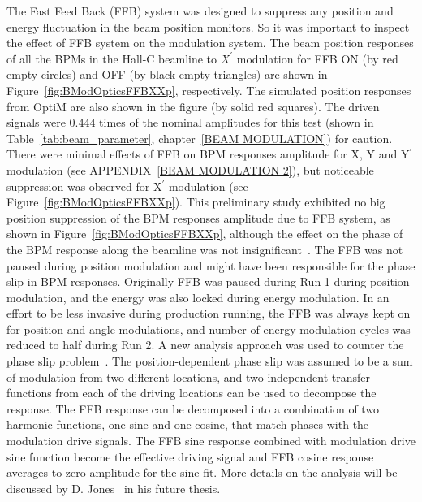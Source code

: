 The Fast Feed Back (FFB) system was designed to suppress any position and energy fluctuation in the beam position monitors. So it was important to inspect the effect of FFB system on the modulation system. The beam position responses of all the BPMs in the Hall-C beamline to $X^{\prime}$ modulation for FFB ON (by red empty circles) and OFF (by black empty triangles) are shown in Figure~\ref{fig:BModOpticsFFBXXp}, respectively. The simulated position responses from OptiM are also shown in the figure (by solid red squares). The driven signals were 0.444 times of the nominal amplitudes for this test (shown in Table~\ref{tab:beam_parameter}, chapter~\ref{BEAM MODULATION}) for caution.
There were minimal effects of FFB on BPM responses amplitude for X, Y and Y$^\prime$ modulation (see APPENDIX~\ref{BEAM MODULATION 2}), but noticeable suppression was observed for X$^\prime$ modulation (see Figure~\ref{fig:BModOpticsFFBXXp}). This preliminary study exhibited no big position suppression of the BPM responses amplitude due to FFB system, as shown in Figure~\ref{fig:BModOpticsFFBXXp}, although the effect on the phase of the BPM response along the beamline was not insignificant~\cite{elog:josh_analysis690}. The FFB was not paused during position modulation and might have been responsible for the phase slip in BPM responses. Originally FFB was paused during Run 1 during position modulation, and the energy was also locked during energy modulation. In an effort to be less invasive during production running, the FFB was always kept on for position and angle modulations, and number of energy modulation cycles was reduced to half during Run 2. A new analysis approach was used to counter the phase slip problem~\cite{elog:kent_analysis695}. The position-dependent phase slip was assumed to be a sum of modulation from two different locations, and two independent transfer functions from each of the driving locations can be used to decompose the response. The FFB response can be decomposed into a combination of two harmonic functions, one sine and one cosine, that match phases with the modulation drive signals. The FFB sine response combined with modulation drive sine function become the effective driving signal and FFB cosine response averages to zero amplitude for the sine fit. More details on the analysis will be discussed by D. Jones~\cite{don_thesis} in his future thesis.



